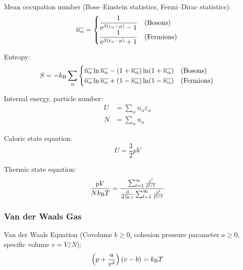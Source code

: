 			\noindent
			Mean occupation number (Bose--Einstein statistics, Fermi--Dirac statistics):
			\begin{equation}
				\overline{n_\alpha} =
				\begin{cases}
					\dfrac{1}{\mathrm{e}^{\beta(\varepsilon_\alpha-\mu)} - 1} & \text{(Bosons)} \\
					\dfrac{1}{\mathrm{e}^{\beta(\varepsilon_\alpha-\mu)} + 1} & \text{(Fermions)}
				\end{cases} \\
			\end{equation}

			\noindent
			Entropy:
			\begin{equation}
				S= -k_{\text{B}}\sum_\alpha
				\begin{cases}
					\overline{n_\alpha} \ln \overline{n_\alpha} - (1+\overline{n_\alpha}) \ln (1+\overline{n_\alpha}) & \text{(Bosons)} \\
					\overline{n_\alpha} \ln \overline{n_\alpha} + (1-\overline{n_\alpha}) \ln (1-\overline{n_\alpha}) & \text{(Fermions)}
				\end{cases} \\
			\end{equation}

			\noindent
			Internal energy, particle number:
			\begin{equation}
				\begin{aligned}
					U &= \sum_\alpha \overline{n_\alpha} \varepsilon_\alpha \\
					N &= \sum_\alpha \overline{n_\alpha}
				\end{aligned}
			\end{equation}

			\noindent
			Caloric state equation:
			\begin{equation}
				U=\frac{3}{2}pV
			\end{equation}

			\noindent
			Thermic state equation:
			\begin{equation}
				\frac{pV}{N k_{\text{B}} T} = \frac{\sum_{l=1}^{\infty}\frac{z^l}{l^{5/2}}}{\dv{\ln z}\sum_{l=1}^{\infty}\frac{z^l}{l^{5/2}}}
			\end{equation}

		\subsubsection{Van der Waals Gas}
			\noindent
			Van der Waals Equation (Covolume $b \ge 0$, cohesion pressure parameter $a \ge 0$, specific volume $v=V/N$):
			\begin{equation}
				\left( p+\frac{a}{v^2} \right) \left( v-b \right) = k_{\text{B}} T
			\end{equation}

